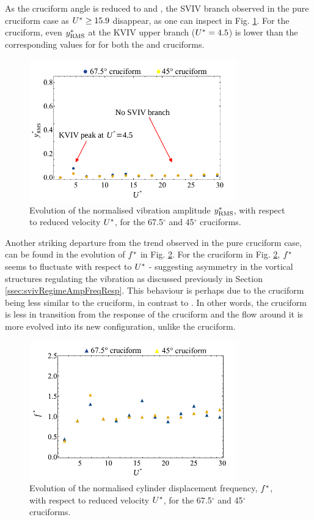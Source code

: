 \documentclass[oneside]{utmthesis}
\begin{document}
As the cruciform angle is reduced to \angfo{} and \angth{}, the SVIV branch observed in the pure cruciform case as $U^{*} \geq 15.9$ disappear, as one can inspect in Fig. \ref{fig:yStrRMS23}. For the \angth{} cruciform, even $y^{*}_{\text{RMS}}$ at the KVIV upper branch ($U^{*} = 4.5$) is lower than the corresponding values for for both the \angfi{} and \angfo{} cruciforms.

\begin{figure}[H]
  \centering
  \includegraphics[width=0.8\textwidth]{figs/yStrRMS23}
  \caption{Evolution of the normalised vibration amplitude $y^{*}_{\text{RMS}}$, with respect to reduced velocity $U^{*}$, for the 67.5$^{\circ}$ and 45$^{\circ}$ cruciforms.}
  \label{fig:yStrRMS23}
\end{figure}

Another striking departure from the trend observed in the pure cruciform case, can be found in the evolution of $f^{*}$ in Fig. \ref{fig:yStrFreq43}. For the \angfo{} cruciform in Fig. \ref{fig:yStrFreq43}, $f^{*}$ seems to fluctuate with respect to $U^{*}$ - suggesting asymmetry in the vortical structures regulating the vibration as discussed previously in Section \ref{ssec:svivRegimeAmpFreqResp}. This behaviour is perhaps due to the \angth{} cruciform being less similar to the \angfi{} cruciform, in contrast to \angfo{}. In other words, the \angth{} cruciform is less in transition from the response of the \angfi{} cruciform and the flow around it is more evolved into its new configuration, unlike the \angfo{} cruciform.

\begin{figure}[H]
  \centering
  \includegraphics[width=0.8\textwidth]{figs/yStrFreq43}
  \caption{Evolution of the normalised cylinder displacement frequency, $f^{*}$, with respect to reduced velocity $U^{*}$, for the 67.5$^{\circ}$ and 45$^{\circ}$ cruciforms.}
  \label{fig:yStrFreq43}
\end{figure}
\end{document}

